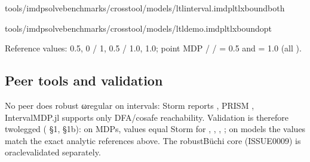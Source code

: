 \documentclass[a4paper,10pt,english]{sphinxmanual}
\begin{document}
\begin{sphinxVerbatim}[commandchars=\\\{\}]
tools/imdp\PYGZus{}solvebenchmarks/crosstool/models/ltl\PYGZus{}interval.imdpltlx\PYGZhy{}\PYGZhy{}boundboth

tools/imdp\PYGZus{}solvebenchmarks/crosstool/models/ltl\PYGZus{}demo.imdpltlx\PYGZhy{}\PYGZhy{}boundopt
\end{sphinxVerbatim}

\sphinxAtStartPar
Reference values:  0.5,  0 / 1, 
0.5 / 1.0,  1.0;  point MDP  /  /  = 0.5 and
 = 1.0 (all ).


\subsection{Peer tools and validation}
\label{\detokenize{manual/omega-ltl:peer-tools-and-validation}}
\sphinxAtStartPar
No peer does robust ω\sphinxhyphen{}regular on intervals: Storm reports , PRISM , IntervalMDP.jl supports only
DFA/co\sphinxhyphen{}safe reachability. Validation is therefore two\sphinxhyphen{}legged (
\S{}1, \S{}1b): on  MDPs,  values equal Storm  for , ,
, ; on  models the values match the exact analytic
references above. The robust\sphinxhyphen{}Büchi core (ISSUE\sphinxhyphen{}0009) is oracle\sphinxhyphen{}validated separately.
\end{document}
